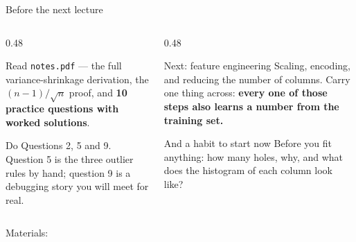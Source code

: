 \documentclass[aspectratio=169]{beamer}
\begin{document}
\begin{frame}[shrink=3]{Before the next lecture}
  \begin{columns}[T]
    \begin{column}{0.48\textwidth}
      \begin{block}{Read}
        \texttt{notes.pdf} --- the full variance-shrinkage derivation, the
        $(n-1)/\sqrt n$ proof, and \textbf{10 practice questions with worked
        solutions}.
      \end{block}
      \begin{block}{Do}
        Questions 2, 5 and 9. Question 5 is the three outlier rules by hand;
        question 9 is a debugging story you will meet for real.
      \end{block}
    \end{column}
    \begin{column}{0.48\textwidth}
      \begin{exampleblock}{Next: feature engineering}
        Scaling, encoding, and reducing the number of columns. Carry one thing
        across: \textbf{every one of those steps also learns a number from the
        training set.}
      \end{exampleblock}
      \begin{alertblock}{And a habit to start now}
        Before you fit anything: how many holes, why, and what does the
        histogram of each column look like?
      \end{alertblock}
    \end{column}
  \end{columns}
  \begin{center}
    \small Materials: \texttt{\AMLRepoURL}
  \end{center}
  \slidesources{\AMLUnitIVSources}
\end{frame}
\end{document}
